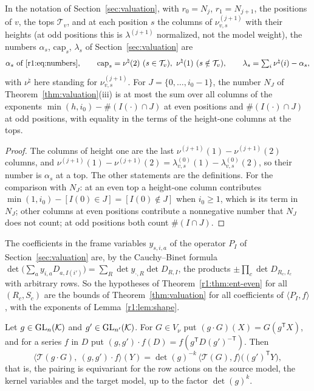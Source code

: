 \begin{lemma}\label{r1:lem:shape}
In the notation of Section~\ref{sec:valuation}, with $r_0=N_j$, $r_1=N_{j+1}$, the positions of $v$, the tops $\mathcal T_v$, and at each position $s$ the columns of $\nu^{(j+1)}_{v,s}$ with their heights (at odd positions this is $\lambda^{(j+1)}$ normalized, not the model weight), the numbers $\alpha_s$, $\mathrm{cap}_s$, $\lambda_s$ of Section~\ref{sec:valuation} are
\[
\alpha_s\ \text{of~\eqref{r1:eq:numbers}},\qquad\mathrm{cap}_s=\nu^\natural(2)\ (s\in\mathcal T_v),\ \nu^\natural(1)\ (s\notin\mathcal T_v),\qquad\lambda_s=\textstyle\sum_i\nu^\natural(i)-\alpha_s,
\]
with $\nu^\natural$ here standing for $\nu^{(j+1)}_{v,s}$. For $J=\{0,\dots,i_0-1\}$, the number $N_J$ of Theorem~\ref{thm:valuation}(iii) is at most the sum over all columns of the exponents $\min(h,i_0)-\#(I(\cdot)\cap J)$ at even positions and $\#(I(\cdot)\cap J)$ at odd positions, with equality in the terms of the height-one columns at the tops.
\end{lemma}

\begin{proof}
The columns of height one are the last $\nu^{(j+1)}(1)-\nu^{(j+1)}(2)$ columns, and $\nu^{(j+1)}(1)-\nu^{(j+1)}(2)=\lambda^{(0)}_{v,s}(1)-\lambda^{(0)}_{v,s}(2)$, so their number is $\alpha_s$ at a top. The other statements are the definitions. For the comparison with $N_J$: at an even top a height-one column contributes $\min(1,i_0)-[I(0)\in J]=[I(0)\notin J]$ when $i_0\ge1$, which is its term in $N_J$; other columns at even positions contribute a nonnegative number that $N_J$ does not count; at odd positions both count $\#(I\cap J)$.
\end{proof}

The coefficients in the frame variables $y_{s,i,a}$ of the operator $P_I$ of Section~\ref{sec:valuation} are, by the Cauchy--Binet formula $\det\big(\sum_ay_{i,a}D_{a,I(i')}\big)=\sum_R\det y_{\cdot,R}\det D_{R,I}$, the products $\pm\prod_c\det D_{R_c,I_c}$ with arbitrary rows. So the hypotheses of Theorem~\ref{r1:thm:ent-even} for all $(R_c,S_c)$ are the bounds of Theorem~\ref{thm:valuation} for all coefficients of $\langle P_I,f\rangle$, with the exponents of Lemma~\ref{r1:lem:shape}.

\begin{lemma}\label{r1:lem:frame-even}
Let $g\in\operatorname{GL}_n(\mathcal K)$ and $g'\in\operatorname{GL}_{n'}(\mathcal K)$. For $G\in V_\nu$ put $(g\cdot G)(X)=G(g^{\mathsf T}X)$, and for a series $f$ in $D$ put $(g,g')\cdot f(D)=f(g^{\mathsf T}D(g')^{-\mathsf T})$. Then
\[
\big\langle\mathcal T(g\cdot G),\ (g,g')\cdot f\big\rangle(Y)=\det(g)^{-k}\,\langle\mathcal T(G),f\rangle\big((g')^{\mathsf T}Y\big),
\]
that is, the pairing is equivariant for the row actions on the source model, the kernel variables and the target model, up to the factor $\det(g)^{k}$.
\end{lemma}

